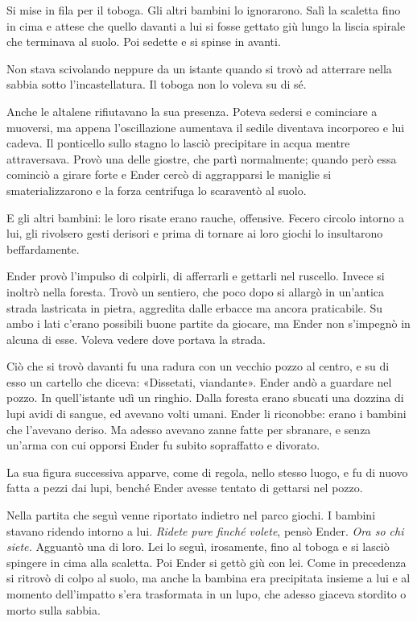 {Si mise in fila per il toboga. Gli altri bambini lo ignorarono. Salì la
	scaletta fino in cima e attese che quello davanti a lui si fosse gettato
	giù lungo la liscia spirale che terminava al suolo. Poi sedette e si
	spinse in avanti.}

{Non stava scivolando neppure da un istante quando si trovò ad atterrare
	nella sabbia sotto l'incastellatura. Il toboga non lo voleva su di sé.}

{Anche le altalene rifiutavano la sua presenza. Poteva sedersi e
	cominciare a muoversi, ma appena l'oscillazione aumentava il sedile
	diventava incorporeo e lui cadeva. Il ponticello sullo stagno lo lasciò
	precipitare in acqua mentre attraversava. Provò una delle giostre, che
	partì normalmente; quando però essa cominciò a girare forte e Ender
	cercò di aggrapparsi le maniglie si smaterializzarono e la forza
	centrifuga lo scaraventò al suolo.}

{E gli altri bambini: le loro risate erano rauche, offensive. Fecero
	circolo intorno a lui, gli rivolsero gesti derisori e prima di tornare
	ai loro giochi lo insultarono beffardamente.}

{Ender provò l'impulso di colpirli, di afferrarli e gettarli nel
	ruscello. Invece si inoltrò nella foresta. Trovò un sentiero, che poco
	dopo si allargò in un'antica strada lastricata in pietra, aggredita
	dalle erbacce ma ancora praticabile. Su ambo i lati c'erano possibili
	buone partite da giocare, ma Ender non s'impegnò in alcuna di esse.
	Voleva vedere dove portava la strada.}

{Ciò che si trovò davanti fu una radura con un vecchio pozzo al centro,
	e su di esso un cartello che diceva: «Dissetati, viandante». Ender andò
	a guardare nel pozzo. In quell'istante udì un ringhio. Dalla foresta
	erano sbucati una dozzina di lupi avidi di sangue, ed avevano volti
	umani. Ender li riconobbe: erano i bambini che l'avevano deriso. Ma
	adesso avevano zanne fatte per sbranare, e senza un'arma con cui opporsi
	Ender fu subito sopraffatto e divorato.}

{La sua figura successiva apparve, come di regola, nello stesso luogo, e
	fu di nuovo fatta a pezzi dai lupi, benché Ender avesse tentato di
	gettarsi nel pozzo.}

{Nella partita che seguì venne riportato indietro nel parco giochi. I
	bambini stavano ridendo intorno a lui. \emph{Ridete pure finché volete},
	\emph{} pensò Ender. \emph{Ora so chi siete.} Agguantò una di loro. Lei
	lo seguì, irosamente, fino al toboga e si lasciò spingere in cima alla
	scaletta. Poi Ender si gettò giù con lei. Come in precedenza si ritrovò
	di colpo al suolo, ma anche la bambina era precipitata insieme a lui e
	al momento dell'impatto s'era trasformata in un lupo, che adesso giaceva
	stordito o morto sulla sabbia.}

